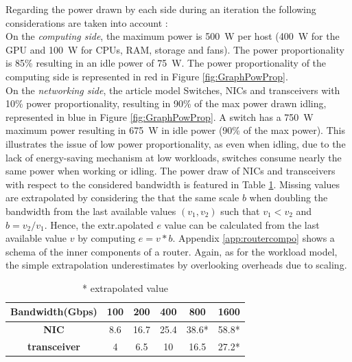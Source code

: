 Regarding the power drawn by each side during an iteration the following considerations are taken into account :
\\On the \textit{computing side}, the maximum power is \qty{500}{\watt} per host (\qty{400}{\watt} for the GPU and \qty{100}{\watt} for CPUs, RAM, storage and fans). The power proportionality is 85\% \cite{ComputePowProp} resulting in an idle power of \qty{75}{\watt}. The power proportionality of the computing side is represented in red in Figure \ref{fig:GraphPowProp}.
\\On the \textit{networking side}, the article model Switches, NICs and transceivers with 10\% power proportionality, resulting in 90\% of the max power drawn idling, represented in blue in Figure \ref{fig:GraphPowProp}.
A switch has a \qty{750}{\watt} maximum power resulting in \qty{675}{\watt} in idle power (90\% of the max power).
This illustrates the issue of low power proportionality, as even when idling, due to the lack of energy-saving mechanism at low workloads, switches consume nearly the same power when working or idling.     
The power draw of NICs and transceivers with respect to the considered bandwidth is featured in Table \ref{tab:PowNicTrans}.
Missing values are extrapolated by considering the that the same scale $b$ when doubling the bandwidth from the last available values $(v_1, v_2)$ such that $v_1 < v_2$ and $b= v_2/v_1$.  
Hence, the extr.apolated $e$ value can be calculated from the last available value $v$ by computing $e = v*b$.
Appendix \ref{app:routercompo} shows a schema of the inner components of a router.
Again, as for the workload model, the simple extrapolation underestimates by overlooking overheads due to scaling.     


\begin{table}[t]
	\caption{Maximum power values for network components.}\label{tab:PowNicTrans}
	\centering
		\begin{tabular}[c]{cccccc}
			\toprule
			\textbf{Bandwidth(Gbps)} & \textbf{100} & \textbf{200} & \textbf{400} & \textbf{800} & \textbf{1600} \\

			\hline
			\textbf{NIC} & 8.6 & 16.7 & 25.4 & 38.6* & 58.8*\\ 
			\hline

			\textbf{transceiver} & 4 & 6.5 & 10 & 16.5 & 27.2*\\ 
			\bottomrule
		\end{tabular}
		\caption{\hspace{4.5cm} * extrapolated value}
\end{table}

